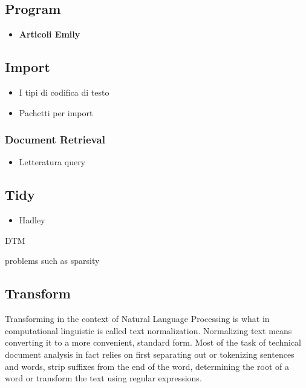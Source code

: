 \documentclass[]{book}
\providecommand{\tightlist}{%
  \setlength{\itemsep}{0pt}\setlength{\parskip}{0pt}}
\begin{document}
\subsection{Program}\label{sotatoolsprogram}

\begin{itemize}
\tightlist
\item
  \textbf{Articoli Emily}
\end{itemize}

\subsection{Import}\label{sotatoolsimport}

\begin{itemize}
\tightlist
\item
  I tipi di codifica di testo
\item
  Pachetti per import
\end{itemize}

\subsubsection{Document Retrieval}\label{sotatoolsimportretrieval}

\begin{itemize}
\tightlist
\item
  Letteratura query
\end{itemize}

\subsection{Tidy}\label{sotatoolstidy}

\begin{itemize}
\tightlist
\item
  Hadley
\end{itemize}

DTM

problems such as sparsity

\subsection{Transform}\label{sotatoolstransform}

Transforming in the context of Natural Language Processing is what in
computational linguistic is called text normalization. Normalizing text
means converting it to a more convenient, standard form. Most of the
task of technical document analysis in fact relies on first separating
out or tokenizing sentences and words, strip suffixes from the end of
the word, determining the root of a word or transform the text using
regular expressions.
\end{document}
